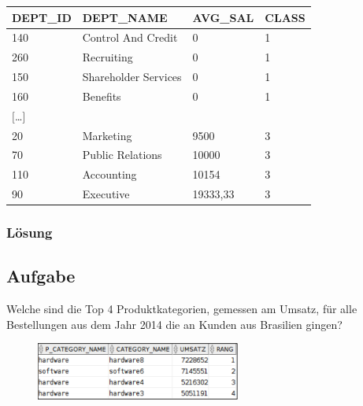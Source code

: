 \begin{table}[H]
  \centering
  \begin{tabular}{|l|l|l|l|}
    \hline
    \textbf{DEPT\_ID} & \textbf{DEPT\_NAME}  & \textbf{AVG\_SAL} & \textbf{CLASS} \\
    \hline
    140               & Control And Credit   & 0                 & 1              \\
    260               & Recruiting           & 0                 & 1              \\
    150               & Shareholder Services & 0                 & 1              \\
    160               & Benefits             & 0                 & 1              \\
    $[$\dots$]$       &                      &                   &                \\
    20                & Marketing            & 9500              & 3              \\
    70                & Public Relations     & 10000             & 3              \\
    110               & Accounting           & 10154             & 3              \\
    90                & Executive            & 19333,33          & 3              \\
    \hline
  \end{tabular}
\end{table}

\subsubsection*{Lösung}
\label{subsubsec:uebung_07.aufgabe_02.loesung}


\subsection{Aufgabe}
\label{subsec:uebung_07.aufgabe_03}
Welche sind die Top 4 Produktkategorien, gemessen am Umsatz, für alle Bestellungen aus dem Jahr 2014 die an Kunden aus Brasilien gingen?

\begin{figure}[H]
  \centering
  \includegraphics[width=0.6\textwidth]{img//uebung_07_-_aufgabe_03.png}
  \label{img:uebung_07_-_aufgabe_03}
\end{figure}

